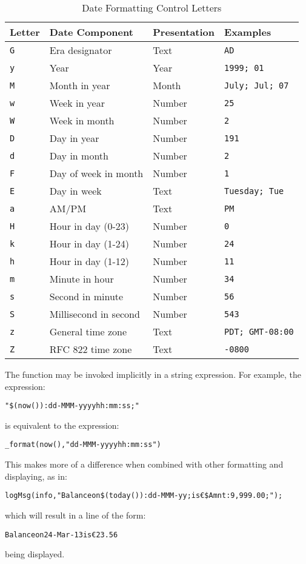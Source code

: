 {\begin{table}[h]
\begin{center}
\caption{Date Formatting Control Letters}\label{tableFormatTbl}
\begin{tabular}{|llll|}
\hline
Letter&Date Component&Presentation&Examples\\
\hline
\tt G&Era designator&Text&\tt AD\\
\tt y&Year&Year&\tt 1999; 01\\
\tt M&Month in year&Month&\tt July; Jul; 07\\
\tt w&Week in year&Number&\tt 25\\
\tt W&Week in month&Number&\tt 2\\
\tt D&Day in year&Number&\tt 191\\
\tt d&Day in month&Number&\tt 2\\
\tt F&Day of week in month&Number&\tt 1\\
\tt E&Day in week&Text&\tt Tuesday; Tue\\
\tt a&AM/PM&Text&\tt PM\\
\tt H&Hour in day (0-23)&Number&\tt 0\\
\tt k&Hour in day (1-24)&Number&\tt 24\\
\tt h&Hour in day (1-12)&Number&\tt 11\\
\tt m&Minute in hour&Number&\tt 34\\
\tt s&Second in minute&Number&\tt 56\\
\tt S&Millisecond in second&Number&\tt 543\\
\tt z&General time zone&Text&\tt PDT; GMT-08:00\\
\tt Z&RFC 822 time zone&Text&\tt -0800\\
\hline
\end{tabular}
\end{center}
\end{table}

The  function may be invoked implicitly in a string  expression. For example, the expression:
\begin{alltt}
"\$(now()):dd-MMM-yyyy hh:mm:ss;"
\end{alltt}
is equivalent to the expression:
\begin{alltt}
\_format(now(),"dd-MMM-yyyy hh:mm:ss")
\end{alltt}
\begin{aside}
This makes more of a difference when combined with other formatting and displaying, as in:
\begin{alltt}
logMsg(info,"Balance on \$(today()):dd-MMM-yy; is \euro\$Amnt:9,999.00;");
\end{alltt}
which will result in a line of the form:
\begin{alltt}
Balance on 24-Mar-13 is \euro{}23.56
\end{alltt}
being displayed.
\end{aside}

}
